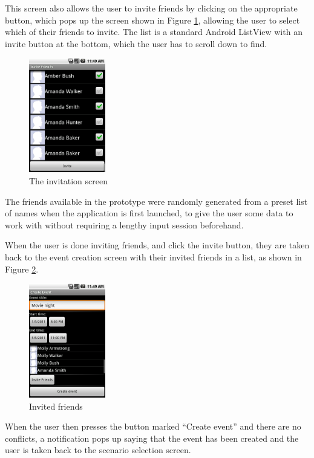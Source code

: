 \documentclass[a4paper,11pt]{report}
\begin{document}
This screen also allows the user to invite friends by clicking on the
appropriate button, which pops up the screen shown in Figure
\ref{fig:invitation}, allowing the user to select which of their friends to
invite. The list is a standard Android ListView with an invite button at the
bottom, which the user has to scroll down to find.

\begin{figure}[htb]
  \centering
  \includegraphics[height=50mm]{invitation}
  \caption{The invitation screen}
  \label{fig:invitation}
\end{figure}

The friends available in the prototype were randomly generated from a preset
list of names when the application is first launched, to give the user some data
to work with without requiring a lengthy input session beforehand.

When the user is done inviting friends, and click the invite button, they are
taken back to the event creation screen with their invited friends in a list, as
shown in Figure \ref{fig:invited}.

\begin{figure}[htb]
  \centering
  \includegraphics[height=50mm]{invited}
  \caption{Invited friends}
  \label{fig:invited}
\end{figure}

When the user then presses the button marked ``Create event'' and there are no
conflicts, a notification pops up saying that the event has been created and the
user is taken back to the scenario selection screen.
\end{document}
